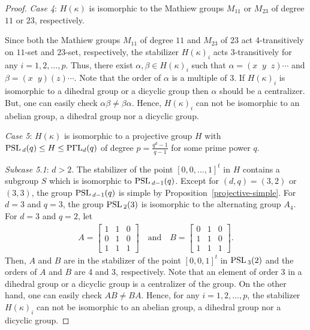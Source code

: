 \documentclass[12pt]{amsart}
\begin{document}
\begin{proof}
\emph{Case 4}: $H(\kappa)$ is isomorphic to the Mathiew groups
$M_{11}$ or $M_{23}$ of degree $11$ or $23$, respectively.

Since both the Mathiew groups $M_{11}$ of degree $11$ and $M_{23}$
of $23$ act 4-transitively on $11$-set and $23$-set, respectively,
 the stabilizer $H(\kappa)_{i}$ acts 3-transitively for any $i =1, 2, \ldots, p$.
 Thus, there exist $\alpha, \beta \in H(\kappa)_{i}$ such that $\alpha=(x \;\;y\;\;z) \cdots$
 and $\beta=(x \;\;y)(z) \cdots$. Note that the order of $\alpha$ is a multiple of $3$. If $H(\kappa)_{i}$
is isomorphic to  a dihedral group or a dicyclic group then
$\alpha$ should be a centralizer. But, one can easily check
$\alpha \beta \neq \beta \alpha$. Hence, $H(\kappa)_{i}$ can not be
isomorphic to an abelian group, a dihedral group nor a dicyclic
group.
\medskip

\emph{Case 5}: $H(\kappa)$ is isomorphic to a projective group $H$
with ${\mbox{\rm PSL\,}}_d(q) \leq H \leq {\rm P}\Gamma {\rm L}_d(q)$ of degree
$p = \frac{q^d-1}{q-1}$ for some prime power $q$.
\medskip

\emph{Subcase 5.1}: $d > 2$.  The stabilizer of the point $[0,0,
\ldots, 1]^{t}$ in $H$ contains a subgroup $S$ which is isomorphic
to ${\mbox{\rm PSL\,}}_{d-1}(q)$. Except for $(d, q) = (3,2)$ or $(3,3)$, the
group ${\mbox{\rm PSL\,}}_{d-1}(q)$ is simple by
Proposition~\ref{projective-simple}. For $d=3$ and $q=3$, the
group ${\mbox{\rm PSL\,}}_{2}(3)$ is isomorphic to the alternating group $A_4$.
For $d=3$ and $q=2$, let
\begin{gather*}
A = \begin{bmatrix} 1 & 1 & 0 \\ 0 & 1 & 0 \\ 1 & 1 & 1
\end{bmatrix} \quad \mbox{and} \quad B = \begin{bmatrix} 0 & 1 & 0 \\ 1 & 1 & 0 \\ 1 & 1 & 1
\end{bmatrix}.
\end{gather*}
Then, $A$ and $B$ are in the stabilizer of the point $[0,0,1]^{t}$
in ${\mbox{\rm PSL\,}}_3(2)$ and the orders of $A$ and $B$ are 4 and 3,
respectively. Note that an element of order $3$ in a dihedral
group or a dicyclic group is  a centralizer of the group. On the
other hand, one can easily check $AB \neq BA$. Hence, for any $i
=1, 2, \ldots, p$, the stabilizer $H(\kappa)_{i}$ can not be
isomorphic to an abelian group, a dihedral group nor a dicyclic
group. \smallskip


\end{proof}
\end{document}
